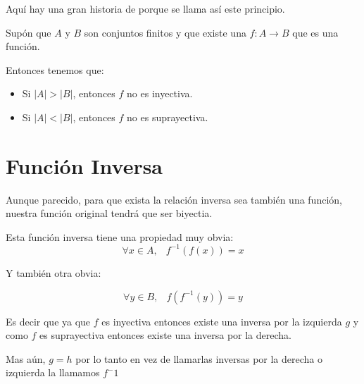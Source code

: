 \documentclass[12pt, fleqn]{report}                             %
\DeclareMathOperator \Space {\quad}                             %
\DeclareMathOperator \MiniSpace {\;}                            %
\begin{document}
            Aquí hay una gran historia de porque se llama así este principio.

            Supón que $A$ y $B$ son conjuntos finitos y que existe una $f: A \to B$ que es una función.

            Entonces tenemos que:
            \begin{itemize}
                \item Si $|A| > |B|$, entonces $f$ no es inyectiva.
                \item Si $|A| < |B|$, entonces $f$ no es suprayectiva.
            \end{itemize}





        \section{Función Inversa}

            Aunque parecido, para que exista la relación inversa sea también una función,
            nuestra función original tendrá que ser biyectia.

            Esta función inversa tiene una propiedad muy obvia:
            \begin{equation*}
                \forall x \in A, \MiniSpace f^{-1}(f(x)) = x
            \end{equation*}

            Y también otra obvia:

            \begin{equation*}
                \forall y \in B, \MiniSpace f(f^{-1}(y)) = y
            \end{equation*}


            Es decir que ya que $f$ es inyectiva entonces existe una inversa por la
            izquierda $g$ y como $f$ es suprayectiva entonces existe una inversa por la
            derecha.

            Mas aún, $g = h$ por lo tanto en vez de llamarlas inversas por la derecha o izquierda
            la llamamos $f^-1$










        \clearpage
\end{document}
